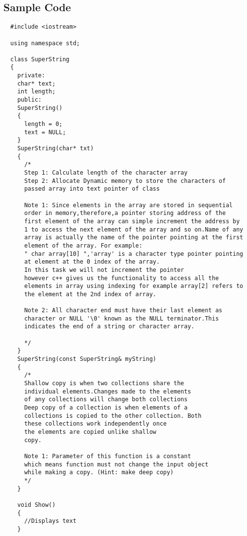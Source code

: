 \documentclass[11pt,fleqn]{book} %
\begin{document}
\subsection{Sample Code}
\begin{lstlisting}
  #include <iostream>
  
  using namespace std;
  
  class SuperString
  {
    private:
    char* text;
    int length;
    public:
    SuperString()
    {
      length = 0;
      text = NULL;
    }
    SuperString(char* txt)
    {
      /*
      Step 1: Calculate length of the character array
      Step 2: Allocate Dynamic memory to store the characters of
      passed array into text pointer of class
      
      Note 1: Since elements in the array are stored in sequential
      order in memory,therefore,a pointer storing address of the
      first element of the array can simple increment the address by 
      1 to access the next element of the array and so on.Name of any 
      array is actually the name of the pointer pointing at the first
      element of the array. For example:
      " char array[10] ",'array' is a character type pointer pointing
      at element at the 0 index of the array.
      In this task we will not increment the pointer
      however c++ gives us the functionality to access all the
      elements in array using indexing for example array[2] refers to
      the element at the 2nd index of array.
      
      Note 2: All character end must have their last element as 
      character or NULL '\0' known as the NULL terminator.This
      indicates the end of a string or character array.
      
      */
    }
    SuperString(const SuperString& myString)
    {
      /*
      Shallow copy is when two collections share the 
      individual elements.Changes made to the elements
      of any collections will change both collections
      Deep copy of a collection is when elements of a 
      collections is copied to the other collection. Both
      these collections work independently once
      the elements are copied unlike shallow
      copy.
      
      Note 1: Parameter of this function is a constant 
      which means function must not change the input object
      while making a copy. (Hint: make deep copy) 
      */
    }
    
    void Show()
    {
      //Displays text
    }
    

\end{lstlisting}
\end{document}
